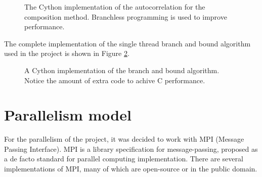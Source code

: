       \begin{figure}[ht!]
        \caption{The Cython implementation of the autocorrelation for the composition method.  Branchless programming is used to improve performance.}
        \label{composite_auto:fig:1}
      \end{figure}

  The complete implementation of the single thread branch and bound algorithm used
  in the project is shown in Figure \ref{composite_auto:fig:2}.

  \begin{figure}[ht!]
    \caption{A Cython implementation of the branch and bound algorithm. Notice
    the amount of extra code to achive C performance.}
    \label{composite_auto:fig:2}
  \end{figure}


  \section{Parallelism model}

  For the parallelism of the project, it was decided to work with MPI (Message Passing Interface).  MPI is a library specification for message-passing, proposed as a de facto standard for parallel computing implementation. There are several implementations of MPI, many of which are open-source or in the public domain.\\

